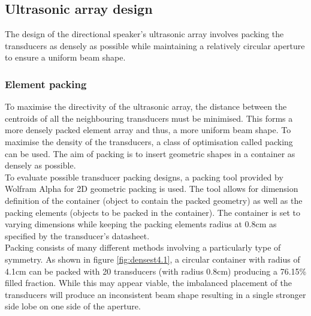 \subsection{Ultrasonic array design}
The design of the directional speaker's ultrasonic array involves packing the transducers as densely as possible while maintaining a relatively circular aperture to ensure a uniform beam shape.
\subsubsection{Element packing}
To maximise the directivity of the ultrasonic array, the distance between the centroids of all the neighbouring transducers must be minimised. This forms a more densely packed element array and thus, a more uniform beam shape.
To maximise the density of the transducers, a class of optimisation called packing can be used. The aim of packing is to insert geometric shapes in a container as densely as possible.\\
To evaluate possible transducer packing designs, a packing tool provided by Wolfram Alpha for 2D geometric packing \cite{alpha_2018} is used. The tool allows for dimension definition of the container (object to contain the packed geometry) as well as the packing elements (objects to be packed in the container). The container is set to varying dimensions while keeping the packing elements radius at 0.8cm as specified by the transducer's datasheet.\\
Packing consists of many different methods involving a particularly type of symmetry. As shown in figure \ref{fig:densest4.1}, a circular container with radius of 4.1cm can be packed with 20 transducers (with radius 0.8cm) producing a 76.15\% filled fraction. While this may appear viable, the imbalanced placement of the transducers will produce an inconsistent beam shape resulting in a single stronger side lobe on one side of the aperture.
\newpage
